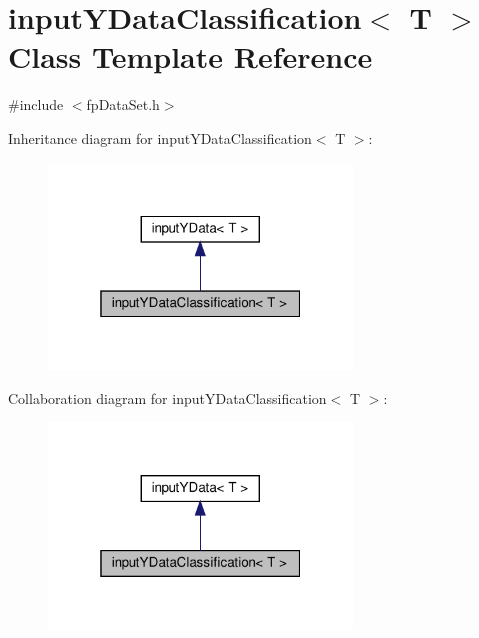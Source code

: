 \hypertarget{classinputYDataClassification}{}\section{input\+Y\+Data\+Classification$<$ T $>$ Class Template Reference}
\label{classinputYDataClassification}


{\ttfamily \#include $<$fp\+Data\+Set.\+h$>$}



Inheritance diagram for input\+Y\+Data\+Classification$<$ T $>$\+:\nopagebreak
\begin{figure}[H]
\begin{center}
\leavevmode
\includegraphics[width=229pt]{classinputYDataClassification__inherit__graph}
\end{center}
\end{figure}


Collaboration diagram for input\+Y\+Data\+Classification$<$ T $>$\+:\nopagebreak
\begin{figure}[H]
\begin{center}
\leavevmode
\includegraphics[width=229pt]{classinputYDataClassification__coll__graph}
\end{center}
\end{figure}
